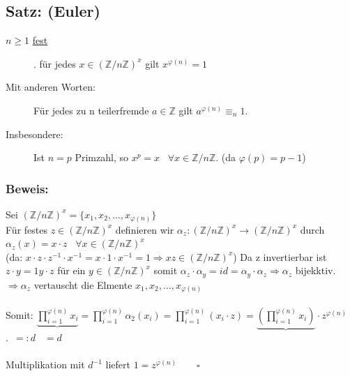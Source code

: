 \subsection{Satz: (Euler)} 
\begin{description}
	\item[$n \geq 1$ \underline{fest}]. für jedes $x \in (\mathbb{Z}/n\mathbb{Z})^{x}$ gilt $x^{\varphi(n)} = 1$ \\ 
	\item[Mit anderen Worten:] Für jedes zu n teilerfremde $a\in \mathbb{Z}$ gilt $a^{\varphi(n)} \equiv_{n} 1$.\\
	\item[Insbesondere:] Ist $n = p$ Primzahl, so $x^{p} = x$ \ $\forall x \in \mathbb{Z}/n\mathbb{Z}$. (da $\varphi (p) 
					= p-1$)
\end{description}

\subsubsection{Beweis:}
Sei $(\mathbb{Z}/n\mathbb{Z})^{x} = \{x_{1}, x_{2}, \dotsc, x_{\varphi(n)}\}$\\
Für festes $ z\in (\mathbb{Z}/n\mathbb{Z})^{x}$ definieren wir $\alpha_{z} : (\mathbb{Z}/n\mathbb{Z})^{x} \rightarrow (\mathbb{Z}/n\mathbb{Z})^{x}$ durch $\alpha_{z} (x) = x \cdot z$ \ $\forall x \in (\mathbb{Z}/n\mathbb{Z})^{x}$\\
(da: $x \cdot z \cdot z^{-1} \cdot x^{-1} = x \cdot 1 \cdot x^{-1} = 1 \Rightarrow x z \in (\mathbb{Z}/n\mathbb{Z})^{x}$) Da z invertierbar ist $z \cdot y = 1 y \cdot z$ für ein $y \in (\mathbb{Z}/n\mathbb{Z})^{x}$ somit $\alpha_{z} \cdot  \alpha_{y} = id = \alpha_{y} \cdot \alpha_{z} \Rightarrow \alpha_{z}$ bijekktiv.\\
$\Rightarrow \alpha_{z}$ vertauscht die Elmente $x_{1}, x_{2}, \dotsc, x_{\varphi(n)}$\\
\qquad\\
Somit: $ \underbrace{\prod \limits^{\varphi(n)}_{i = 1} x_{i}} = \prod \limits^{\varphi(n)}_{i = 1} \alpha_{2} (x_{i}) = \prod \limits^{\varphi(n)}_{i = 1} (x_{i} \cdot z) = \underbrace{(\prod \limits^{\varphi(n)}_{i = 1} x_{i})}\cdot z^{\varphi(n)}$\\
.\ \quad \qquad $ =: d$ \qquad \qquad \qquad \qquad  \qquad \qquad \ \quad $= d$\\
\qquad\\
Multiplikation mit $d^{-1}$ liefert $1 = z^{\varphi(n)} \qquad \square$
